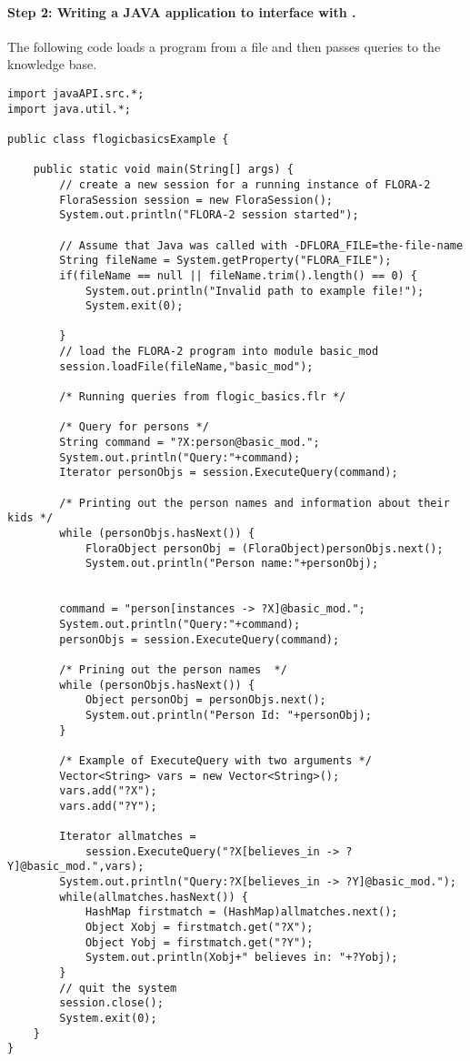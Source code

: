 \paragraph{Step 2:  Writing a JAVA application to interface with \FLORA.}
 The following code loads a \FLORA program from a file and then passes
 queries to the knowledge base.

\begin{verbatim}
import javaAPI.src.*;
import java.util.*;

public class flogicbasicsExample {

    public static void main(String[] args) {
        // create a new session for a running instance of FLORA-2
        FloraSession session = new FloraSession();
        System.out.println("FLORA-2 session started");

        // Assume that Java was called with -DFLORA_FILE=the-file-name
        String fileName = System.getProperty("FLORA_FILE");
        if(fileName == null || fileName.trim().length() == 0) {
            System.out.println("Invalid path to example file!");
            System.exit(0);

        }
        // load the FLORA-2 program into module basic_mod
        session.loadFile(fileName,"basic_mod");

        /* Running queries from flogic_basics.flr */

        /* Query for persons */
        String command = "?X:person@basic_mod.";
        System.out.println("Query:"+command);
        Iterator personObjs = session.ExecuteQuery(command);

        /* Printing out the person names and information about their kids */
        while (personObjs.hasNext()) {
            FloraObject personObj = (FloraObject)personObjs.next();
            System.out.println("Person name:"+personObj);


        command = "person[instances -> ?X]@basic_mod.";
        System.out.println("Query:"+command);
        personObjs = session.ExecuteQuery(command);

        /* Prining out the person names  */
        while (personObjs.hasNext()) {
            Object personObj = personObjs.next();
            System.out.println("Person Id: "+personObj);
        }

        /* Example of ExecuteQuery with two arguments */
        Vector<String> vars = new Vector<String>();
        vars.add("?X");
        vars.add("?Y");

        Iterator allmatches =
            session.ExecuteQuery("?X[believes_in -> ?Y]@basic_mod.",vars);
        System.out.println("Query:?X[believes_in -> ?Y]@basic_mod.");
        while(allmatches.hasNext()) {
            HashMap firstmatch = (HashMap)allmatches.next();
            Object Xobj = firstmatch.get("?X");
            Object Yobj = firstmatch.get("?Y");
            System.out.println(Xobj+" believes in: "+?Yobj);
        }
        // quit the system
        session.close();
        System.exit(0);
    }
}
\end{verbatim}

